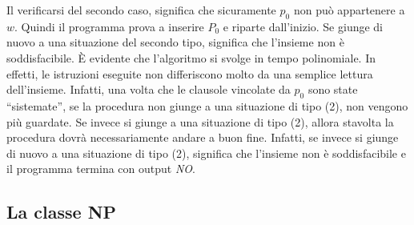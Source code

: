 \documentclass[12pt,a4paper]{report}
\theoremstyle{definition}
\begin{document}
Il verificarsi del secondo caso, significa che sicuramente $p_0$ non può appartenere a $w$. Quindi il programma prova a inserire $P_0$ e riparte dall'inizio. Se giunge di nuovo a una situazione del secondo tipo, significa che l'insieme non è soddisfacibile.
È evidente che l'algoritmo si svolge in tempo polinomiale. In effetti, le istruzioni eseguite non differiscono molto da una semplice lettura dell'insieme. Infatti, una volta che le clausole vincolate da $p_0$ sono state ``sistemate'', se la procedura non giunge a una situazione di tipo (2), non vengono più guardate. Se invece si giunge a una situazione di tipo (2), allora stavolta la procedura dovrà necessariamente andare a buon fine. Infatti, se invece si giunge di nuovo a una situazione di tipo (2), significa che l'insieme non è soddisfacibile e il programma termina con output \emph{NO}.


\subsection{La classe NP}\label{SAT}
\end{document}

